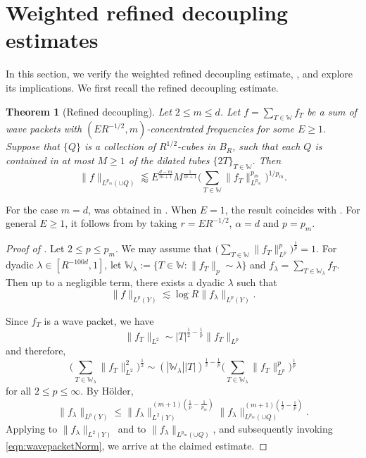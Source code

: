 \documentclass[11pt]{amsart}
\newtheorem{theorem}{Theorem}[section]
\theoremstyle{definition}
\theoremstyle{remark}
\numberwithin{equation}{section}
\newcommand{\W}{\mathbb{W}}
\newcommand{\les}{\lesssim}
\newcommand{\less}{\lessapprox}
\begin{document}
\section{Weighted refined decoupling estimates}\label{sec:implications}
In this section, we verify the weighted refined decoupling estimate,  , and explore its implications. We first recall the refined decoupling estimate.
\begin{theorem}[Refined decoupling] \label{thm:refined_decouplingDuGeneral}
	Let $2\leq m \leq d$. Let $f = \sum_{T \in \W} f_T$ be a sum of wave packets with $(ER^{-1/2}, m)$-concentrated frequencies for some $E\geq 1$. Suppose that $\{ Q\}$ is a collection of $R^{1/2}$-cubes in $B_R$, such that each $Q$ is contained in at most $M\geq 1$ of the dilated tubes $\{ 2T\}_{T\in \W}$. Then
	\[ \| f \|_{L^{p_m}(\cup Q)} \less E^{\frac{d-m}{m+1}} M^{\frac{1}{m+1}} \Big( \sum_{T\in \W} \| f_T \|_{L^{p_m}}^{p_m} \Big)^{1/p_m}. \]
\end{theorem}
For the case $m=d$,  was obtained in \cite{GIOW}. When $E=1$, the result coincides with \cite[Theorem 1.2(a)]{du2023weighted}. For general $E\geq 1$, it follows from \cite[Theorem 1.2(c)]{du2023weighted} by taking $r=ER^{-1/2}$, $\alpha = d$ and $p=p_m$. 

\begin{proof}[Proof of  ]
	Let $2\leq p \leq p_m$. 
	We may assume that $\Big( \sum_{T\in \W} \| f_T \|_{L^p}^p \Big)^{\frac{1}{p}} = 1$. For dyadic $\lambda \in [R^{-100d} , 1]$, let $\W_\lambda := \{ T\in \W: \| f_T \|_p \sim \lambda \}$ and $f_\lambda = \sum_{T\in \W_\lambda} f_T$. Then up to a negligible term, there exists a dyadic $\lambda$ such that 
	\[ 
	\| f\|_{L^p(Y)} \les \log R   \| f_\lambda \|_{L^p(Y)}.
	\]
	
	Since $f_T$ is a wave packet, we have \[ \| f_T \|_{L^2} \sim |T|^{\frac{1}{2}-\frac{1}{p}} \| f_T\|_{L^p}\] 
	and therefore,
	\begin{equation}\label{eqn:wavepacketNorm}
		\bigg( \sum_{T\in \W_\lambda} \| f_T\|_{L^2}^2  \bigg)^\frac{1}{2} \sim  (|\W_\lambda| |T|)^{\frac{1}{2}-\frac{1}{p}} \bigg( \sum_{T\in \W_\lambda}  \| f_T\|_{L^p}^p \bigg)^{\frac{1}{p}} 
	\end{equation}
	for all $2\leq p\leq \infty$. 
	By H\"{o}lder, 
	\[ \| f_\lambda \|_{L^p(Y)} \leq \| f_\lambda \|_{L^2(Y)}^{(m+1)(\frac{1}{p}-\frac{1}{p_m})} \| f_\lambda\|_{L^{p_m}(\cup Q)}^{(m+1)(\frac{1}{2}-\frac{1}{p})}. \]
	Applying  to $\| f_\lambda \|_{L^2(Y)}$ and  to $\| f_\lambda \|_{L^{p_m}(\cup Q)}$, and subsequently invoking \eqref{eqn:wavepacketNorm}, we arrive at the claimed estimate.
\end{proof}
\end{document}
